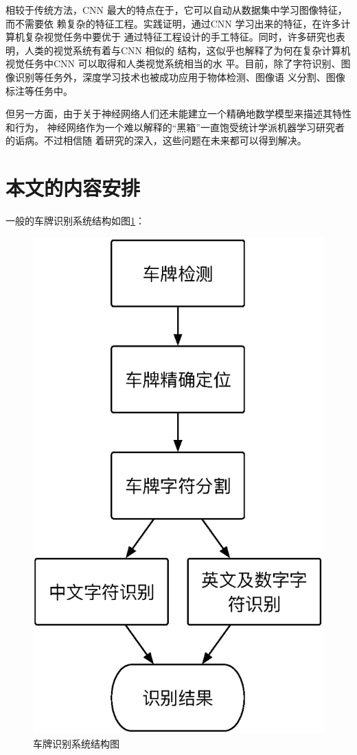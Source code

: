 相较于传统方法，CNN 最大的特点在于，它可以自动从数据集中学习图像特征，而不需要依
赖复杂的特征工程。实践证明，通过CNN 学习出来的特征，在许多计算机复杂视觉任务中要优于
通过特征工程设计的手工特征。同时，许多研究也表明，人类的视觉系统有着与CNN 相似的
结构，这似乎也解释了为何在复杂计算机视觉任务中CNN 可以取得和人类视觉系统相当的水
平。目前，除了字符识别、图像识别等任务外，深度学习技术也被成功应用于物体检测、图像语
义分割、图像标注等任务中。

但另一方面，由于关于神经网络人们还未能建立一个精确地数学模型来描述其特性和行为，
神经网络作为一个难以解释的“黑箱”一直饱受统计学派机器学习研究者的诟病。不过相信随
着研究的深入，这些问题在未来都可以得到解决。

\section{本文的内容安排}

一般的车牌识别系统结构如图\ref{Fig:SystemArch}：

\begin{figure}[ht]
  \centering
  \includegraphics[height=0.5\textheight, keepaspectratio]{./Figure/SystemArch.eps}
  \caption{车牌识别系统结构图}\label{Fig:SystemArch}
\end{figure}

